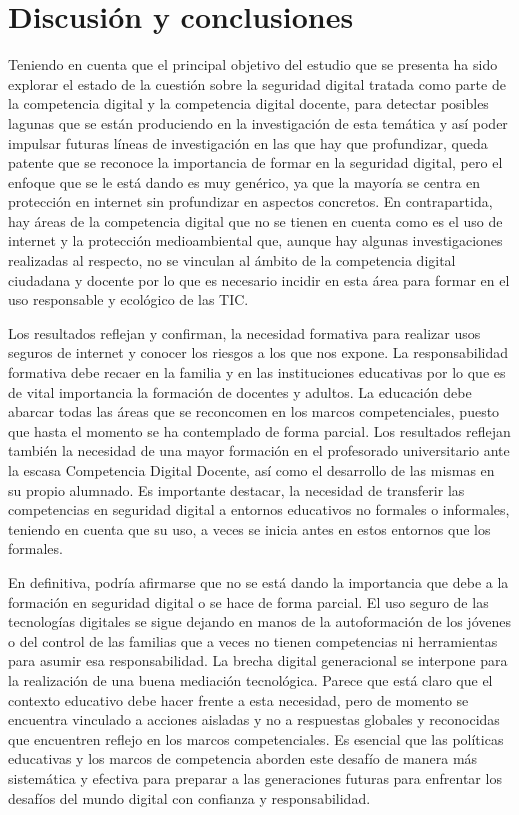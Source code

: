 \documentclass[spanish]{textolivre}
\begin{document}
\section{Discusión y conclusiones}\label{sec-idioma}
Teniendo en cuenta que el principal objetivo del estudio que se presenta ha sido explorar el estado de la cuestión sobre la seguridad digital tratada como parte de la competencia digital y la competencia digital docente, para detectar posibles lagunas que se están produciendo en la investigación de esta temática y así poder impulsar futuras líneas de investigación en las que hay que profundizar, queda patente que se reconoce la importancia de formar en la seguridad digital, pero el enfoque que se le está dando es muy genérico, ya que la mayoría se centra en protección en internet sin profundizar en aspectos concretos. En contrapartida, hay áreas de la competencia digital que no se tienen en cuenta como es el uso de internet y la protección medioambiental que, aunque hay algunas investigaciones realizadas al respecto, no se vinculan al ámbito de la competencia digital ciudadana y docente por lo que es necesario incidir en esta área para formar en el uso responsable y ecológico de las TIC.

Los resultados reflejan y confirman, la necesidad formativa para realizar usos seguros de internet y conocer los riesgos a los que nos expone. La responsabilidad formativa debe recaer en la familia y en las instituciones educativas por lo que es de vital importancia la formación de docentes y adultos. La educación debe abarcar todas las áreas que se reconcomen en los marcos competenciales, puesto que hasta el momento se ha contemplado de forma parcial. Los resultados reflejan también la necesidad de una mayor formación en el profesorado universitario ante la escasa Competencia Digital Docente, así como el desarrollo de las mismas en su propio alumnado. Es importante destacar, la necesidad de transferir las competencias en seguridad digital a entornos educativos no formales o informales, teniendo en cuenta que su uso, a veces se inicia antes en estos entornos que los formales.

En definitiva, podría afirmarse que no se está dando la importancia que debe a la formación en seguridad digital o se hace de forma parcial. El uso seguro de las tecnologías digitales se sigue dejando en manos de la autoformación de los jóvenes o del control de las familias que a veces no tienen competencias ni herramientas para asumir esa responsabilidad. La brecha digital generacional se interpone para la realización de una buena mediación tecnológica. Parece que está claro que el contexto educativo debe hacer frente a esta necesidad, pero de momento se encuentra vinculado a acciones aisladas y no a respuestas globales y reconocidas que encuentren reflejo en los marcos competenciales. Es esencial que las políticas educativas y los marcos de competencia aborden este desafío de manera más sistemática y efectiva para preparar a las generaciones futuras para enfrentar los desafíos del mundo digital con confianza y responsabilidad.
\end{document}
